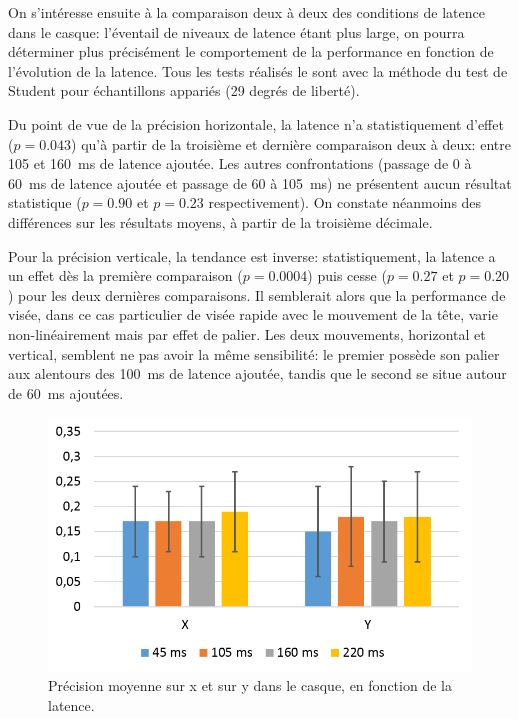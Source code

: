 	\par On s'intéresse ensuite à la comparaison deux à deux des conditions de latence dans le casque: l'éventail de niveaux de latence étant plus large, on pourra déterminer plus précisément le comportement de la performance en fonction de l'évolution de la latence. Tous les tests réalisés le sont avec la méthode du test de Student pour échantillons appariés (29 degrés de liberté).
	
	\par Du point de vue de la précision horizontale, la latence n'a statistiquement d'effet ($p = 0.043$) qu'à partir de la troisième et dernière comparaison deux à deux: entre 105 et 160~ms de latence ajoutée. Les autres confrontations (passage de 0 à 60~ms de latence ajoutée et passage de 60 à 105~ms) ne présentent aucun résultat statistique ($p = 0.90$ et $p = 0.23$ respectivement). On constate néanmoins des différences sur les résultats moyens, à partir de la troisième décimale.
	
	\par Pour la précision verticale, la tendance est inverse: statistiquement, la latence a un effet dès la première comparaison ($p = 0.0004$) puis cesse ($p = 0.27$ et $p = 0.20$) pour les deux dernières comparaisons. Il semblerait alors que la performance de visée, dans ce cas particulier de visée rapide avec le mouvement de la tête, varie non-linéairement mais par effet de palier. Les deux mouvements, horizontal et vertical, semblent ne pas avoir la même sensibilité: le premier possède son palier aux alentours des 100~ms de latence ajoutée, tandis que le second se situe autour de 60~ms ajoutées.
	
	\begin{figure}
		\centering
		\includegraphics[width=0.8\linewidth]{Figures/CasquePrecisionResults.png}
		\caption{Précision moyenne sur x et sur y dans le casque, en fonction de la latence.}
		\label{fig:casque_precision}
	\end{figure}
	
